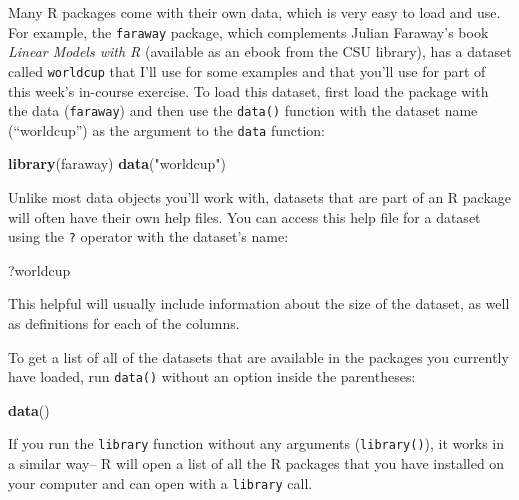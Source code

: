 \documentclass[]{book}
\makeatletter
\newenvironment{Shaded}{\begin{snugshade}}{\end{snugshade}}
\newcommand{\KeywordTok}[1]{\textcolor[rgb]{0.13,0.29,0.53}{\textbf{{#1}}}}
\newcommand{\StringTok}[1]{\textcolor[rgb]{0.31,0.60,0.02}{{#1}}}
\newcommand{\NormalTok}[1]{{#1}}
\newenvironment{kframe}{%
\medskip{}
\setlength{\fboxsep}{.8em}
 \def\at@end@of@kframe{}%
 \ifinner\ifhmode%
  \def\at@end@of@kframe{\end{minipage}}%
  \begin{minipage}{\columnwidth}%
 \fi\fi%
 \def\FrameCommand##1{\hskip\@totalleftmargin \hskip-\fboxsep
 \colorbox{shadecolor}{##1}\hskip-\fboxsep
     \hskip-\linewidth \hskip-\@totalleftmargin \hskip\columnwidth}%
 \MakeFramed {\advance\hsize-\width
   \@totalleftmargin\z@ \linewidth\hsize
   \@setminipage}}%
 {\par\unskip\endMakeFramed%
 \at@end@of@kframe}
\renewenvironment{Shaded}{\begin{kframe}}{\end{kframe}}
\newenvironment{rmdblock}[1]
  {
  \begin{itemize}
  \renewcommand{\labelitemi}{
    \raisebox{-.7\height}[0pt][0pt]{
      {\setkeys{Gin}{width=3em,keepaspectratio}\texttt{[image: images/\#1]}}
    }
  }
  \setlength{\fboxsep}{1em}
  \begin{kframe}
  \item
  }
  {
  \end{kframe}
  \end{itemize}
  }
\newenvironment{rmdnote}
  {\begin{rmdblock}{note}}
  {\end{rmdblock}}
\makeatother
\begin{document}
Many R packages come with their own data, which is very easy to load and
use. For example, the \texttt{faraway} package, which complements Julian
Faraway's book \emph{Linear Models with R} (available as an ebook from
the CSU library), has a dataset called \texttt{worldcup} that I'll use
for some examples and that you'll use for part of this week's in-course
exercise. To load this dataset, first load the package with the data
(\texttt{faraway}) and then use the \texttt{data()} function with the
dataset name (``worldcup'') as the argument to the \texttt{data}
function:

\begin{Shaded}
\begin{Highlighting}[]
\KeywordTok{library}\NormalTok{(faraway)}
\KeywordTok{data}\NormalTok{(}\StringTok{"worldcup"}\NormalTok{)}
\end{Highlighting}
\end{Shaded}

Unlike most data objects you'll work with, datasets that are part of an
R package will often have their own help files. You can access this help
file for a dataset using the \texttt{?} operator with the dataset's
name:

\begin{Shaded}
\begin{Highlighting}[]
\NormalTok{?worldcup}
\end{Highlighting}
\end{Shaded}

This helpful will usually include information about the size of the
dataset, as well as definitions for each of the columns.

To get a list of all of the datasets that are available in the packages
you currently have loaded, run \texttt{data()} without an option inside
the parentheses:

\begin{Shaded}
\begin{Highlighting}[]
\KeywordTok{data}\NormalTok{()}
\end{Highlighting}
\end{Shaded}

\begin{rmdnote}
If you run the \texttt{library} function without any arguments
(\texttt{library()}), it works in a similar way-- R will open a list of
all the R packages that you have installed on your computer and can open
with a \texttt{library} call.
\end{rmdnote}
\end{document}
